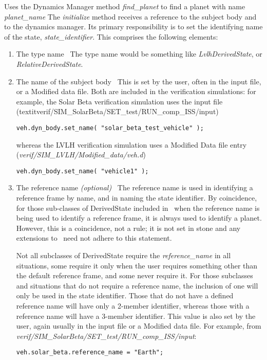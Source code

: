 \begin{itemize}
Uses the Dynamics Manager method \textit{find\_planet} to find a planet with name \textit{planet\_name}
The \textit{initialize} method receives a reference to the subject body and to the dynamics manager.  Its primary responsibility is to set the identifying name of the state, \textit{state\_identifier}.  This comprises the following elements:
\begin{enumerate}
\item{The type name}\ \newline
The type name would be something like \textit{LvlhDerivedState}, or \textit{RelativeDerivedState}.
\item{The name of the subject body}\ \newline
This is set by the user, often in the input file, or a Modified data file.  Both are included in the verification simulations:  for example, the Solar Beta verification simulation uses the input file (textit{verif/SIM\_SolarBeta/SET\_test/RUN\_comp\_ISS/input})
\begin{verbatim}
veh.dyn_body.set_name( "solar_beta_test_vehicle" );
\end{verbatim}
whereas the LVLH verification simulation uses a Modified Data file entry \newline (\textit{verif/SIM\_LVLH/Modified\_data/veh.d})
\begin{verbatim}
veh.dyn_body.set_name( "vehicle1" );
\end{verbatim}

\item{The reference name \textit{(optional)}}\ \newline
The reference name is used in identifying a reference frame by name, and in naming the state identifier.  By coincidence, for those sub-classes of DerivedState included in \JEODid\, when the reference name is being used to identify a reference frame, it is always used to identify a planet.  However, this is a coincidence, not a rule; it is not set in stone and any extensions to \JEODid\ need not adhere to this statement.

Not all subclasses of DerivedState require the \textit{reference\_name} in all situations, some require it only when the user requires something other than the default reference frame, and some never require it.  For those subclasses and situations that do not require a reference name, the inclusion of one will only be used in the state identifier.  Those that do not have a defined reference name will have only a 2-member identifier, whereas those with a reference name will have a 3-member identifier.  This value is also set by the user, again usually in the input file or a Modified data file.
For example, from \textit{verif/SIM\_SolarBeta/SET\_test/RUN\_comp\_ISS/input}:
\begin{verbatim}
veh.solar_beta.reference_name = "Earth";
\end{verbatim}
\end{enumerate}


\end{itemize}
